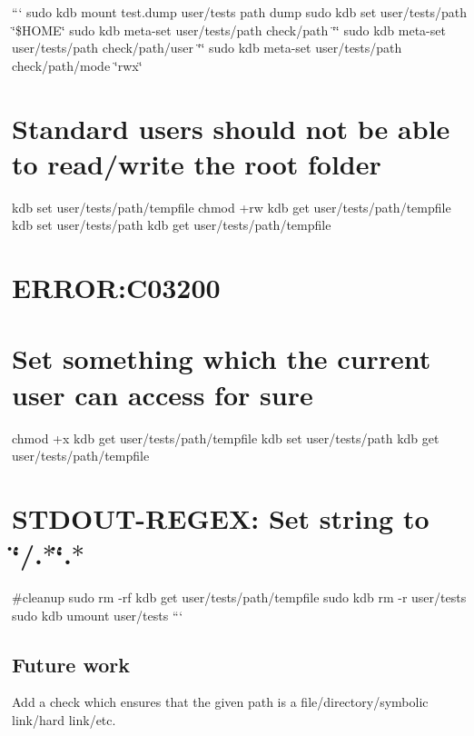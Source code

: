 ``` sudo kdb mount test.\+dump user/tests path dump sudo kdb set user/tests/path \char`\"{}\$\+H\+O\+M\+E\char`\"{} sudo kdb meta-\/set user/tests/path check/path \char`\"{}\char`\"{} sudo kdb meta-\/set user/tests/path check/path/user \char`\"{}\char`\"{} sudo kdb meta-\/set user/tests/path check/path/mode \char`\"{}rwx\char`\"{}\hypertarget{autotoc_md522_autotoc_md526}{}\section{Standard users should not be able to read/write the root folder}\label{autotoc_md522_autotoc_md526}
kdb set user/tests/path/tempfile  chmod +rw {\ttfamily kdb get user/tests/path/tempfile} kdb set user/tests/path {\ttfamily kdb get user/tests/path/tempfile} \hypertarget{autotoc_md522_autotoc_md527}{}\section{E\+R\+R\+O\+R\+:\+C03200}\label{autotoc_md522_autotoc_md527}
\hypertarget{autotoc_md522_autotoc_md528}{}\section{Set something which the current user can access for sure}\label{autotoc_md522_autotoc_md528}
chmod +x {\ttfamily kdb get user/tests/path/tempfile} kdb set user/tests/path {\ttfamily kdb get user/tests/path/tempfile} \hypertarget{autotoc_md522_autotoc_md529}{}\section{S\+T\+D\+O\+U\+T-\/\+R\+E\+G\+E\+X\+: Set string to \char`\"{}/.$\ast$\char`\"{}.$\ast$}\label{autotoc_md522_autotoc_md529}
\#cleanup sudo rm -\/rf {\ttfamily kdb get user/tests/path/tempfile} sudo kdb rm -\/r user/tests sudo kdb umount user/tests ```\hypertarget{autotoc_md522_autotoc_md530}{}\subsection{Future work}\label{autotoc_md522_autotoc_md530}
Add a check which ensures that the given path is a file/directory/symbolic link/hard link/etc. 